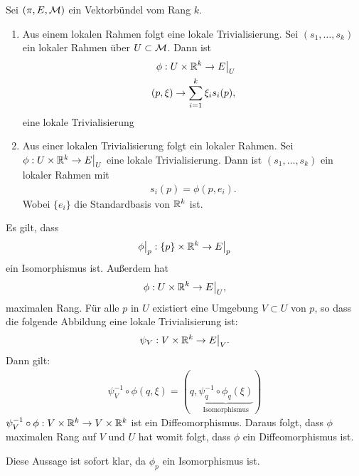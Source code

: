 \begin{satz}
\label{satz:lokalrahmentrivialisierung}
Sei $(\pi, E, \mathcal{M})$ ein Vektorbündel vom Rang $k$.
\begin{enumerate}
\item Aus einem lokalen Rahmen folgt eine lokale Trivialisierung.
Sei $(s_1, \dots, s_k)$ ein lokaler Rahmen über $U\subset\mathcal{M}$.
Dann ist 
\begin{align}
\phi : U \times \mathbb{R}^k \to E \big\vert_U\\
(p, \xi) \to \sum^k_{i=1} \xi_i s_i (p),
\end{align}
eine lokale Trivialisierung
\item  Aus einer lokalen Trivialisierung folgt ein lokaler Rahmen.
Sei $\phi: U \times \mathbb{R}^k \to E \big\vert_U$ eine lokale Trivialisierung.
Dann ist $(s_1, \dots, s_k)$ ein lokaler Rahmen mit 
\begin{align}
s_i(p) = \phi (p, e_i).
\end{align} 
Wobei $\{ e_i \}$ die Standardbasis von $\mathbb{R}^k$ ist.
\end{enumerate}
\end{satz}
\begin{bew}
Es gilt, dass 
\begin{align}
\phi \big\vert_p : \{ p \} \times \mathbb{R}^k \to E \big\vert_p
\end{align}
ein Isomorphismus ist.
Außerdem hat
\begin{align}
\phi : U \times \mathbb{R}^k \to E \big\vert_U,
\end{align}
maximalen Rang.
Für alle $p$ in $U$ existiert eine Umgebung $V \subset U$ von $p$, so dass die folgende Abbildung eine lokale Trivialisierung ist:
\begin{align}
\psi_V : V\times \mathbb{R}^k \to E \big\vert_V.
\end{align}
Dann gilt:
\begin{align}
\psi^{-1}_V \circ  \phi (q, \xi) = (q, \underbrace{\psi^{-1}_q \circ \phi_q(\xi)}_{\mathrm{Isomorphismus}})
\end{align}
$\psi^{-1}_V \circ \phi : V \times \mathbb{R}^k \to V \times \mathbb{R}^k$ ist ein Diffeomorphismus.
Daraus folgt, dass $\phi$ maximalen Rang auf $V$ und $U$ hat womit folgt, dass $\phi$ ein Diffeomorphismus ist.
\end{bew}
\begin{bew}
Diese Aussage ist sofort klar, da $\phi_p$ ein Isomorphismus ist.
\end{bew}

